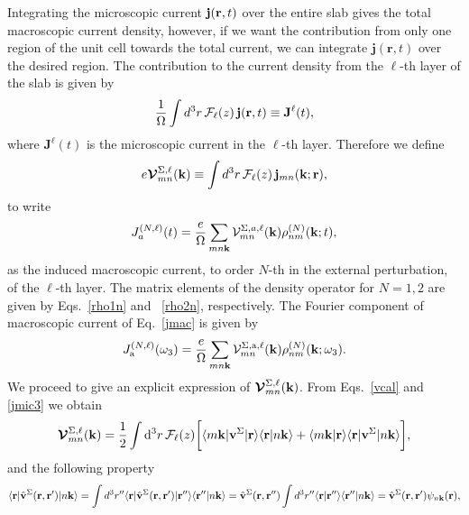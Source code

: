 \documentclass{article}
\begin{document}
Integrating the microscopic current $\mathbf{j}(\mathbf{r},t)$ over
the entire slab gives the total macroscopic current density, 
 however, if we want the
contribution from only one region of the unit cell towards the total
current, we can integrate $\mathbf{j}({\mathbf r},t)$ over the
desired region. The contribution to the current density from the
$\ell$-th layer of the slab is given by
\begin{equation}\label{jsz}
\frac{1}{\Omega}\int d^3r\, {\mathbf{\cal F}}_\ell(z)\, \mathbf{j}(\mathbf{r},t)
 \equiv \mathbf{J}^{\ell}(t),
\end{equation}
where $\mathbf{J}^{\ell}(t)$ is the microscopic current  in the
$\ell$-th layer.
Therefore we define
\begin{equation}\label{vcal}
e{\boldsymbol{\mathcal{V}}}^{\Sigma,\ell}_{mn}(\mathbf{k})
\equiv
\int d^3r\, {\mathbf{\cal F}}_\ell(z)\,\mathbf{j}_{mn}({\mathbf{k}};\mathbf{r}),
\end{equation}
to write
\begin{equation}\label{jmac}
J_a^{(N,\ell)}(t)=\frac{e}{\Omega}
\sum_{mn\mathbf{k}}
\mathcal{V}^{\Sigma,a,\ell}_{mn}(\mathbf{k})
\rho^{(N)}_{nm}(\mathbf{k};t),
\end{equation}
as the induced macroscopic current, to order $N$-th in the external
perturbation, of the  $\ell$-th layer. The matrix elements of the
density operator for $N=1,2$ are given by Eqs.~\eqref{rho1n} and
~\eqref{rho2n}, respectively. 
The Fourier component of macroscopic current of Eq.~\eqref{jmac} is given by
\begin{equation}\label{jmac2}
J_{\mathrm{a}}^{(N,\ell)}(\omega_3)=\frac{e}{\Omega}
\sum_{mn\mathbf{k}}
{\mathbf{\cal V}}^{\Sigma,\mathrm{a},\ell}_{mn}(\mathbf{k})
\rho^{(N)}_{nm}(\mathbf{k};\omega_3)
.
\end{equation}
We proceed to give an explicit expression of
$\boldsymbol{\mathcal{\cal V}}^{\Sigma,\ell}_{mn}(\mathbf{k})$.
From
Eqs.~\eqref{vcal} and \eqref{jmic3} we obtain
\begin{equation}\label{intj}
{\boldsymbol{\mathcal{V}}}^{\Sigma,\ell}_{mn}({\mathbf k})=
\frac{1}{2}
\int \mathrm{d}^3 r\,
 {\mathbf{\cal F}}_\ell(z)
\bigg[
\langle m\mathbf{k}|\mathbf{v}^\Sigma | \mathbf{r}\rangle
\langle \mathbf{r} | n \mathbf k \rangle +
\langle m\mathbf{k} | \mathbf{r}\rangle
\langle \mathbf{r} | \mathbf{v}^\Sigma | n \mathbf k \rangle\bigg]
,
\end{equation}  
and the following property
\begin{equation}\label{nl.2}
\langle \mathbf{r} | \hat{\mathbf{v}}^\Sigma(\mathbf{r},\mathbf{r}')| n\mathbf{k} \rangle
=\int d^3 r'' \langle \mathbf{r} |\hat{\mathbf{v}}^\Sigma(\mathbf{r},\mathbf{r}')| \mathbf{r}'' \rangle
\langle {\mathbf{r}''} | {n\mathbf{k}} \rangle
=\hat{\mathbf{v}}^\Sigma(\mathbf{r},\mathbf{r}'')
\int d^3 r'' \langle {\mathbf{r}} | {\mathbf{r}''} \rangle
\langle {\mathbf{r}''} | {n\mathbf{k}} \rangle
=\hat{\mathbf{v}}^\Sigma(\mathbf{r},\mathbf{r}')
\psi_{n\mathbf{k}}(\mathbf{r})
,
\end{equation}
\end{document}
